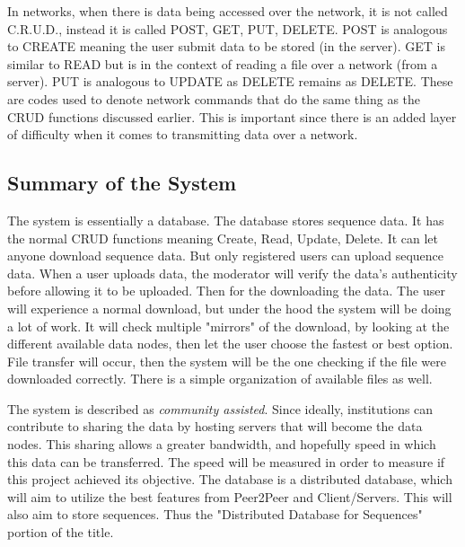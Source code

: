 \documentclass{article}
\begin{document}

In networks, when there is data being accessed over the network, it is not called C.R.U.D., instead it is called POST, GET, PUT, DELETE. POST is analogous to CREATE meaning the user submit data to be stored (in the server). GET is similar to READ but is in the context of reading a file over a network (from a server). PUT is analogous to UPDATE as DELETE remains as DELETE. These are codes used to denote network commands that do the same thing as the CRUD functions discussed earlier. This is important since there is an added layer of difficulty when it comes to transmitting data over a network.


\subsection{Summary of the System}
The system is essentially a database. The database stores sequence data. It has the normal CRUD functions meaning Create, Read, Update, Delete. It can let anyone download sequence data. But only registered users can upload sequence data. When a user uploads data, the moderator will verify the data's authenticity before allowing it to be uploaded. Then for the downloading the data. The user will experience a normal download, but under the hood the system will be doing a lot of work. It will check multiple "mirrors" of the download, by looking at the different available data nodes, then let the user choose the fastest or best option. File transfer will occur, then the system will be the one checking if the file were downloaded correctly. There is a simple organization of available files as well.



The system is described as \textit{community assisted}. Since ideally, institutions can contribute to sharing the data by hosting servers that will become the data nodes. This sharing allows a greater bandwidth, and hopefully speed in which this data can be transferred. The speed will be measured in order to measure if this project achieved its objective. The database is a distributed database, which will aim to utilize the best features from Peer2Peer and Client/Servers. This will also aim to store sequences. Thus the "Distributed Database for Sequences" portion of the title.
\end{document}
